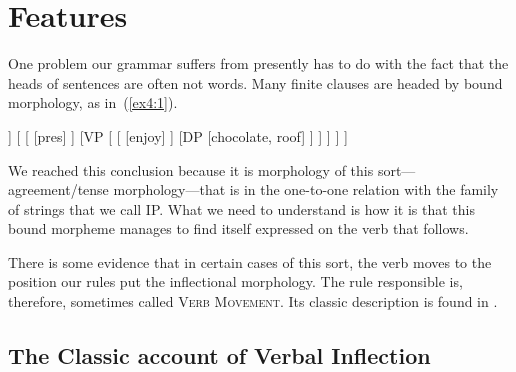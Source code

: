 \chapter{Features}
\label{ch:features}
\setcounter{exx}{0}

\noindent
One problem our grammar suffers from presently has to do with the fact that the heads of sentences are often not words. Many finite clauses are headed by bound morphology, as in~(\ref{ex4:1}).
\begin{exe}
\ex \label{ex4:1}
\small
\begin{forest}
[IP 
	[DP [she, roof]]
	[ 
		[ [pres] ]
		[VP [
			[ ]
			[DP [chocolate, roof] ]
		] ]
	]
]
\end{forest}
\end{exe}
We reached this conclusion because it is morphology of this sort---agreement/tense morphology---that is in the one-to-one relation with the family of strings that we call IP. What we need to understand is how it is that this bound morpheme manages to find itself expressed on the verb that follows. 

There is some evidence that in certain cases of this sort, the verb moves to the position our rules put the inflectional morphology. The rule responsible is, therefore, sometimes called \textsc{Verb Movement}. Its classic description is found in \citet{Chomsky:1957}.

\section{The Classic account of Verbal Inflection}

